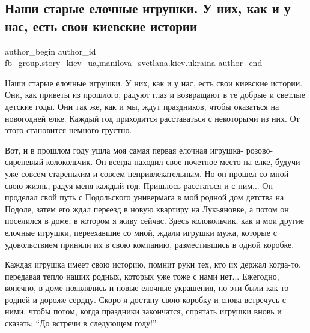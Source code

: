  
 
 
 
 
 
\subsection{Наши старые елочные игрушки. У них, как и у нас, есть свои киевские истории}
\label{sec:26_12_2021.fb.fb_group.story_kiev_ua.1.jelochnye_igruski}
 
\ifcmt
 author_begin
   author_id fb_group.story_kiev_ua,manilova_svetlana.kiev.ukraina
 author_end
\fi

Наши старые елочные игрушки. У них, как и у нас, есть свои киевские истории.
Они, как приветы из прошлого, радуют глаз и возвращают в те добрые и светлые
детские годы. Они так же, как и мы, ждут праздников, чтобы оказаться на
новогодней елке. Каждый год приходится расставаться с некоторыми из них. От
этого становится немного грустно. 


Вот, и в прошлом году ушла моя самая первая елочная игрушка- розово- сиреневый
колокольчик. Он всегда находил свое почетное место на елке, будучи уже совсем
стареньким и совсем непривлекательным. Но он прошел со мной свою жизнь, радуя
меня каждый год. Пришлось расстаться и с ним... Он проделал свой путь с
Подольского универмага в мой родной дом детства на Подоле, затем его ждал
переезд в новую квартиру на Лукьяновке, а потом он поселился в доме, в котором
я живу сейчас. Здесь колокольчик, как и мои другие елочные игрушки, переехавшие
со мной, ждали игрушки мужа, которые с удовольствием приняли их в свою
компанию, разместившись в одной коробке. 


Каждая игрушка имеет свою историю, помнит руки тех, кто их держал когда-то,
передавая тепло наших родных, которых уже тоже с нами нет... Ежегодно, конечно,
в доме появлялись и новые елочные украшения, но эти были как-то родней и дороже
сердцу. Скоро я достану свою коробку и снова встречусь с ними, чтобы потом,
когда праздники закончатся, спрятать игрушки вновь и сказать: \enquote{До
встречи в следующем году!}

